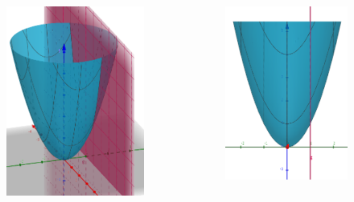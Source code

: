 \begin{frame}

\begin{columns}
\begin{figure}
\includegraphics[width=.78\linewidth]{./geschichtliches/adeline/img/partAbl_2_alpha}
\end{figure}

\begin{figure}
\includegraphics[width=.6\linewidth]{./geschichtliches/adeline/img/partAbl_3_alpha}
\end{figure}


\end{columns}
\end{frame}
